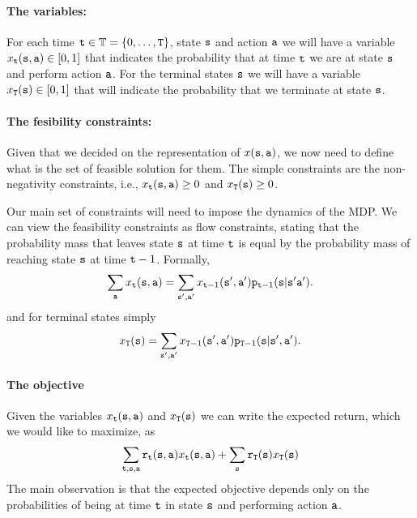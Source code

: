 \paragraph{The variables:}
For each time ${\tt t}\in\mathbb{T}=\{0,\ldots, {\tt T}\}$, state ${\tt s}$ and action
${\tt a}$ we will have a variable
$x_{{\tt t}}({\tt s},{\tt a})\in[0,1]$ that indicates the
probability that at time ${\tt t}$ we are at state ${\tt s}$ and
perform action ${\tt a}$. For the terminal states ${\tt s}$ we will
have a variable $x_{{\tt T}}({\tt s})\in[0,1]$ that will indicate the probability that we terminate at state ${\tt s}$.

\paragraph{The fesibility constraints:}
Given that we decided on the representation of $x({\tt s},{\tt a})$, we now need to define what is the set of feasible solution for them.
%
The simple constraints are the non-negativity constraints, i.e., $x_{\tt t}({\tt s},{\tt a})\geq 0$ and $x_{\tt T}({\tt s})\geq 0$.


Our main set of constraints will need to impose the dynamics of the MDP.
We can view the feasibility constraints as flow constraints, stating that the
probability mass that leaves state ${\tt s}$ at time ${\tt t}$ is
equal by the probability mass of reaching state ${\tt s}$ at time
${\tt t}-1$.
%
Formally,
\[
\sum_{{\tt a}} x_{{\tt t}}({\tt s},{\tt a})=
\sum_{{\tt s}',{\tt a}'}
x_{{\tt t}-1}({\tt s}',{\tt a}'){\tt p}_{{\tt t}-1}({\tt s}|{\tt s}'{\tt a}').
\]
and for terminal states simply
\[
x_{{\tt T}}({\tt s})=\sum_{{\tt s}',{\tt a}'}
x_{{\tt T}-1}({\tt s}',{\tt a}'){\tt p}_{{\tt T}-1}({\tt s}|{\tt s}',{\tt a}').
\]




\paragraph{The objective}
Given the variables  $x_{\tt t}({\tt s},{\tt a})$ and $x_{\tt T}({\tt s})$ we can write the expected return, which we would like to maximize, as
\[
\sum_{{\tt t},{\tt s},{\tt a}}
{\tt r}_{{\tt t}}({\tt s},{\tt a})x_{{\tt t}}({\tt s},{\tt a})+\sum_{{\tt s}}{\tt r}_{{\tt T}}({\tt s})x_{{\tt T}}({\tt s})
\]
The main observation is that the expected objective depends only on the probabilities of being at time ${\tt t}$ in state ${\tt s}$ and performing action ${\tt a}$.



